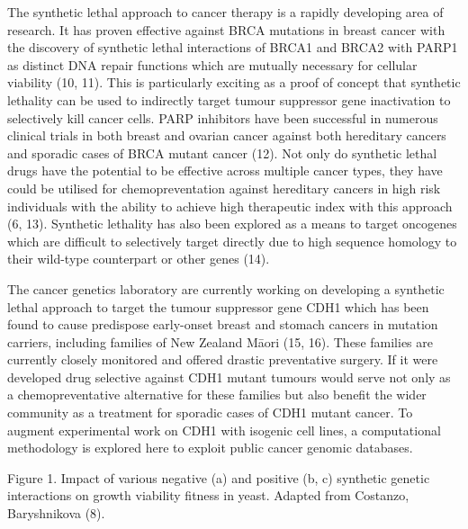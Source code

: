 The synthetic lethal approach to cancer therapy is a rapidly developing area of research. It has proven effective against BRCA mutations in breast cancer with the discovery of synthetic lethal interactions of BRCA1 and BRCA2 with PARP1 as distinct DNA repair functions which are mutually necessary for cellular viability (10, 11). This is particularly exciting as a proof of concept that synthetic lethality can be used to indirectly target tumour suppressor gene inactivation to selectively kill cancer cells. PARP inhibitors have been successful in numerous clinical trials in both breast and ovarian cancer against both hereditary cancers and sporadic cases of BRCA mutant cancer (12). Not only do synthetic lethal drugs have the potential to be effective across multiple cancer types, they have could be utilised for chemopreventation against hereditary cancers in high risk individuals with the ability to achieve high therapeutic index with this approach (6, 13). Synthetic lethality has also been explored as a means to target oncogenes which are difficult to selectively target directly due to high sequence homology to their wild-type counterpart or other genes (14).

The cancer genetics laboratory are currently working on developing a synthetic lethal approach to target the tumour suppressor gene CDH1 which has been found to cause predispose early-onset breast and stomach cancers in mutation carriers, including families of New Zealand M\={a}ori (15, 16). These families are currently closely monitored and offered drastic preventative surgery. If it were developed drug selective against CDH1 mutant tumours would serve not only as a chemopreventative alternative for these families but also benefit the wider community as a treatment for sporadic cases of CDH1 mutant cancer. To augment experimental work on CDH1 with isogenic cell lines, a computational methodology is explored here to exploit public cancer genomic databases.

Figure 1. Impact of various negative (a) and positive (b, c) synthetic genetic interactions on growth viability fitness in yeast. Adapted from Costanzo, Baryshnikova (8).  

